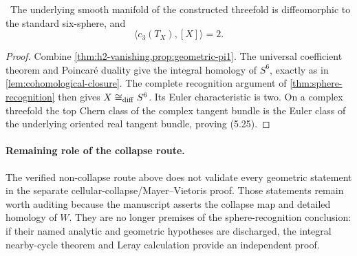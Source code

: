\begin{corollary}
\label{cor:candidate-sphere}
\Verified\ The underlying smooth manifold of the constructed threefold is
diffeomorphic to the standard six-sphere, and
\[
 \langle c_3(T_X),[X]\rangle=2.
\tag{5.25}
\]
\end{corollary}

\begin{proof}
Combine \cref{thm:h2-vanishing,prop:geometric-pi1}.  The universal
coefficient theorem and Poincar\'e duality give the integral homology of
\(S^6\), exactly as in \cref{lem:cohomological-closure}.  The complete
recognition argument of \cref{thm:sphere-recognition} then gives
\(X\cong_{\rm diff}S^6\).  Its Euler characteristic is two.  On a complex
threefold the top Chern class of the complex tangent bundle is the Euler
class of the underlying oriented real tangent bundle, proving (5.25).
\end{proof}

\paragraph{Remaining role of the collapse route.}
The verified non-collapse route above does not validate every geometric statement in the separate
cellular-collapse/Mayer--Vietoris proof.  Those statements remain worth
auditing because the manuscript asserts the collapse map and detailed
homology of \(W\).  They are no longer premises of the sphere-recognition
conclusion: if their named analytic and geometric hypotheses are discharged,
the integral nearby-cycle theorem and Leray calculation provide an
independent proof.

